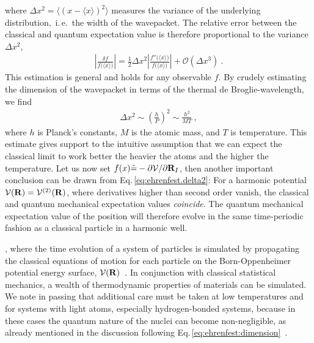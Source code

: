 where $\Delta x^2 = \bm{\langle} (x - \langle x \rangle)^2 \bm{\rangle}$ measures the variance of the underlying distribution,~i.\,e.~the width of the wavepacket. The relative error between the classical and quantum expectation value is %
therefore proportional to the variance $\Delta x^2$,
\begin{align}
\left\lvert \frac{\delta f}{f \bm ( \langle x \rangle \bm{)}} \right\rvert
= \frac{1}{2} \Delta x^2 \left\lvert \frac{f'' \bm ( \langle x \rangle \bm{)}}{f \bm ( \langle x \rangle \bm{)}} \right\rvert
+ \mathcal{O}(\Delta x^3)~.
\label{eq:ehrenfest.delta2}
\end{align}
This estimation is general and holds for any observable $f$.
By crudely estimating the dimension of the wavepacket in terms of the thermal de Broglie-wavelength, we find
\begin{align}
\Delta x^2 
\sim \left( \frac{h}{P} \right)^2
\sim \frac{h^2}{MT}~,
\label{eq:ehrenfest:dimension}
\end{align}
where $h$ is Planck's constants, $M$ is the atomic mass, and $T$ is temperature. This estimate gives support to the intuitive assumption that we can expect the classical limit to work better the heavier the atoms and the higher the temperature.
Let us now set $f(x) \hat = -\partial \mathcal V / \partial {\bf R}_I$, then another important conclusion can be drawn from Eq.\,\eqref{eq:ehrenfest.delta2}: For a harmonic potential $\mathcal V ({\bf R}) = \mathcal V^{(2)} ({\bf R})$, where derivatives higher than second order vanish, the classical and quantum mechanical expectation values \emph{coincide}. The quantum mechanical expectation value of the position will therefore evolve in the same time-periodic fashion as a classical particle in a harmonic well.

, where the time evolution of a system of particles is simulated by propagating the classical equations of motion for each particle on the Born-Oppenheimer potential energy surface, $\mathcal V ({\bf R})$~. In conjunction with classical statistical mechanics, a wealth of thermodynamic properties of materials can be simulated.
We note in passing that
additional care must be taken at low temperatures and for systems with light atoms, especially hydrogen-bonded systems, because in these cases the quantum nature of the nuclei can become non-negligible, as already mentioned in the discussion following Eq.\,\eqref{eq:ehrenfest:dimension}~.

